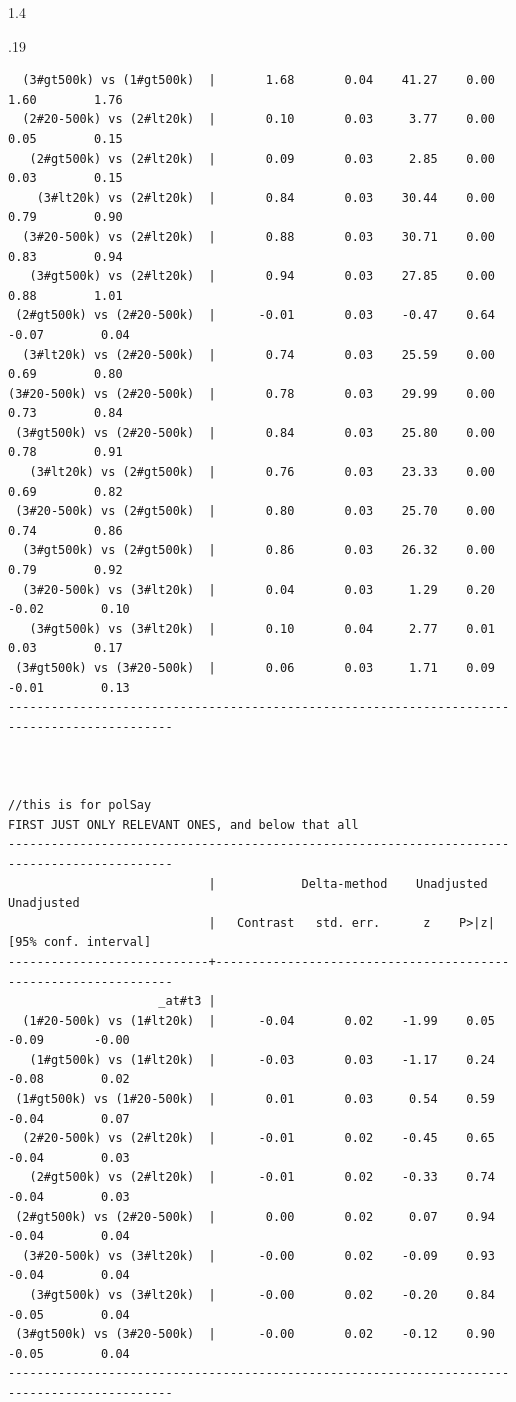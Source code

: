 \documentclass[10pt, letterpaper]{article}
\begin{document}
\begin{spacing}{1.4}
\begin{scriptsize}
\begin{spacing}{.19}
\begin{verbatim}
  (3#gt500k) vs (1#gt500k)  |       1.68       0.04    41.27    0.00         1.60        1.76
  (2#20-500k) vs (2#lt20k)  |       0.10       0.03     3.77    0.00         0.05        0.15
   (2#gt500k) vs (2#lt20k)  |       0.09       0.03     2.85    0.00         0.03        0.15
    (3#lt20k) vs (2#lt20k)  |       0.84       0.03    30.44    0.00         0.79        0.90
  (3#20-500k) vs (2#lt20k)  |       0.88       0.03    30.71    0.00         0.83        0.94
   (3#gt500k) vs (2#lt20k)  |       0.94       0.03    27.85    0.00         0.88        1.01
 (2#gt500k) vs (2#20-500k)  |      -0.01       0.03    -0.47    0.64        -0.07        0.04
  (3#lt20k) vs (2#20-500k)  |       0.74       0.03    25.59    0.00         0.69        0.80
(3#20-500k) vs (2#20-500k)  |       0.78       0.03    29.99    0.00         0.73        0.84
 (3#gt500k) vs (2#20-500k)  |       0.84       0.03    25.80    0.00         0.78        0.91
   (3#lt20k) vs (2#gt500k)  |       0.76       0.03    23.33    0.00         0.69        0.82
 (3#20-500k) vs (2#gt500k)  |       0.80       0.03    25.70    0.00         0.74        0.86
  (3#gt500k) vs (2#gt500k)  |       0.86       0.03    26.32    0.00         0.79        0.92
  (3#20-500k) vs (3#lt20k)  |       0.04       0.03     1.29    0.20        -0.02        0.10
   (3#gt500k) vs (3#lt20k)  |       0.10       0.04     2.77    0.01         0.03        0.17
 (3#gt500k) vs (3#20-500k)  |       0.06       0.03     1.71    0.09        -0.01        0.13
---------------------------------------------------------------------------------------------



//this is for polSay
FIRST JUST ONLY RELEVANT ONES, and below that all
---------------------------------------------------------------------------------------------
                            |            Delta-method    Unadjusted           Unadjusted
                            |   Contrast   std. err.      z    P>|z|     [95% conf. interval]
----------------------------+----------------------------------------------------------------
                     _at#t3 |
  (1#20-500k) vs (1#lt20k)  |      -0.04       0.02    -1.99    0.05        -0.09       -0.00
   (1#gt500k) vs (1#lt20k)  |      -0.03       0.03    -1.17    0.24        -0.08        0.02
 (1#gt500k) vs (1#20-500k)  |       0.01       0.03     0.54    0.59        -0.04        0.07
  (2#20-500k) vs (2#lt20k)  |      -0.01       0.02    -0.45    0.65        -0.04        0.03
   (2#gt500k) vs (2#lt20k)  |      -0.01       0.02    -0.33    0.74        -0.04        0.03
 (2#gt500k) vs (2#20-500k)  |       0.00       0.02     0.07    0.94        -0.04        0.04
  (3#20-500k) vs (3#lt20k)  |      -0.00       0.02    -0.09    0.93        -0.04        0.04
   (3#gt500k) vs (3#lt20k)  |      -0.00       0.02    -0.20    0.84        -0.05        0.04
 (3#gt500k) vs (3#20-500k)  |      -0.00       0.02    -0.12    0.90        -0.05        0.04
---------------------------------------------------------------------------------------------




\end{verbatim}
\end{spacing}
\end{scriptsize}
\end{spacing}
\end{document}
